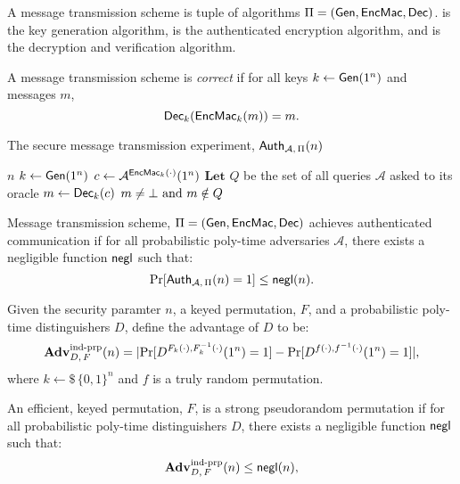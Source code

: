 \documentclass{article}
\begin{document}
\begin{definition}
	A message transmission scheme is tuple of algorithms $\Pi = (\text{\sf Gen}, \text{\sf EncMac}, \text{\sf Dec})$.  is the key generation algorithm,  is the authenticated encryption algorithm, and  is the decryption and verification algorithm.

	A message transmission scheme is \emph{correct} if for all keys $k\gets \text{\sf Gen}(1^n)$ and messages $m$,
	$$\text{\sf Dec}_k(\text{\sf EncMac}_k(m)) = m.$$
\end{definition}

\begin{algorithm}
	\caption{The secure message transmission experiment, $\text{\sf Auth}_{\mathcal{A},\, \Pi}(n)$ \cite{modern_crypto}}\label{alg:header_auth}
	\begin{algorithmic}
		\Require $n$
		\State $k \gets \text{\sf Gen}(1^n)$
		\State $c \gets \mathcal{A}^{\text{\sf EncMac}_k(\cdot)}(1^n)$
		\State $\textbf{Let } Q$ be the set of all queries $\mathcal{A}$ asked to its oracle
		\State $m \gets \text{\sf Dec}_k(c)$
		\Ensure $m \neq \bot \text{ and } m \notin Q$
	\end{algorithmic}
\end{algorithm}

\begin{definition}
	Message transmission scheme, $\Pi = (\text{\sf Gen}, \text{\sf EncMac}, \text{\sf Dec})$ achieves authenticated communication if for all probabilistic poly-time adversaries $\mathcal{A}$, there exists a negligible function $\text{\sf negl}$ such that:
	$$\text{Pr}[\text{\sf Auth}_{\mathcal{A},\, \Pi}(n) = 1] \leq \text{\sf negl}(n).$$
\end{definition}

\begin{definition}
	Given the security paramter $n$, a keyed permutation, $F$, and a probabilistic poly-time distinguishers $D$, define the advantage of $D$ to be:
	$$\mathbf{Adv}^\text{ind-prp}_{D,\,F}(n) = |\text{Pr}[D^{F_k(\cdot), F_k^{-1}(\cdot)}(1^n) = 1] - \text{Pr}[D^{f(\cdot), f^{-1}(\cdot)}(1^n) = 1]|,$$
	where $k\gets\$\,\{0,1\}^n$ and $f$ is a truly random permutation.

	An efficient, keyed permutation, $F$, is a strong pseudorandom permutation if for all probabilistic poly-time distinguishers $D$, there exists a negligible function $\text{\sf negl}$ such that:
	$$\mathbf{Adv}^\text{ind-prp}_{D,\,F}(n) \leq \text{\sf negl}(n),$$
\end{definition}
\end{document}
